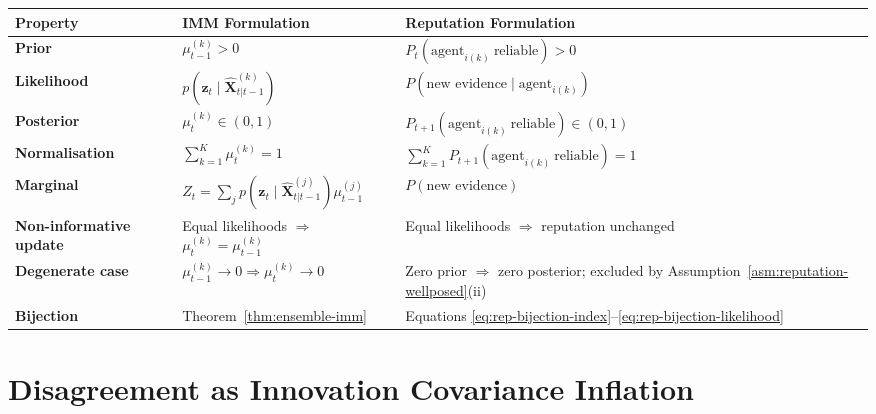 \documentclass[12pt,openany]{book}
\numberwithin{equation}{chapter}
\theoremstyle{plain}
\theoremstyle{definition}
\theoremstyle{remark}
\begin{document}
\begin{center}
\begin{tabularx}{\linewidth}{>{\bfseries}p{3.2cm} X X}
\toprule
\textbf{Property} &
\textbf{IMM Formulation} &
\textbf{Reputation Formulation} \\
\midrule
Prior & $\mu_{t-1}^{(k)} > 0$ &
$P_t(\text{agent}_{i(k)}\ \text{reliable}) > 0$ \\[3pt]
Likelihood & $p(\mathbf{z}_t \mid \hat{\mathbf{X}}_{t|t-1}^{(k)})$ &
$P(\text{new evidence} \mid \text{agent}_{i(k)})$ \\[3pt]
Posterior & $\mu_t^{(k)} \in (0,1)$ &
$P_{t+1}(\text{agent}_{i(k)}\ \text{reliable}) \in (0,1)$ \\[3pt]
Normalisation &
$\sum_{k=1}^{K} \mu_t^{(k)} = 1$ &
$\sum_{k=1}^{K} P_{t+1}(\text{agent}_{i(k)}\ \text{reliable}) = 1$ \\[3pt]
Marginal & $Z_t = \sum_j
p(\mathbf{z}_t\!\mid\!\hat{\mathbf{X}}_{t|t-1}^{(j)})
\mu_{t-1}^{(j)}$ &
$P(\text{new evidence})$ \\[3pt]
Non-informative update &
Equal likelihoods $\Rightarrow$ $\mu_t^{(k)} = \mu_{t-1}^{(k)}$ &
Equal likelihoods $\Rightarrow$ reputation unchanged \\[3pt]
Degenerate case &
$\mu_{t-1}^{(k)}\!\to\!0 \Rightarrow \mu_t^{(k)}\!\to\!0$ &
Zero prior $\Rightarrow$ zero posterior; excluded by
Assumption~\ref{asm:reputation-wellposed}(ii) \\[3pt]
Bijection & Theorem~\ref{thm:ensemble-imm} &
Equations \eqref{eq:rep-bijection-index}--\eqref{eq:rep-bijection-likelihood} \\
\bottomrule
\end{tabularx}
\end{center}

\section{Disagreement as Innovation Covariance Inflation}
\end{document}
